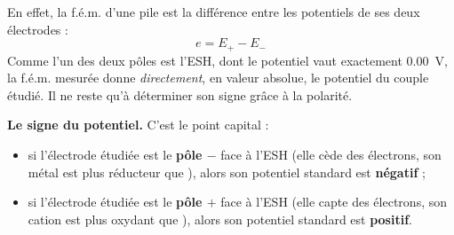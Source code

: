 \documentclass[11pt]{article}
\begin{document}
En effet, la f.é.m. d'une pile est la différence entre les potentiels de ses deux électrodes :
\[ e = E_{+} - E_{-} \]
Comme l'un des deux pôles est l'ESH, dont le potentiel vaut exactement \SI{0,00}{V}, la f.é.m. mesurée donne \emph{directement}, en valeur absolue, le potentiel du couple étudié. Il ne reste qu'à déterminer son signe grâce à la polarité.

\textbf{Le signe du potentiel.} C'est le point capital :
\begin{itemize}
\item si l'électrode étudiée est le \textbf{pôle $-$} face à l'ESH (elle cède des électrons, son métal est plus réducteur que ), alors son potentiel standard est \textbf{négatif} ;
\item si l'électrode étudiée est le \textbf{pôle $+$} face à l'ESH (elle capte des électrons, son cation est plus oxydant que ), alors son potentiel standard est \textbf{positif}.
\end{itemize}
\end{document}
